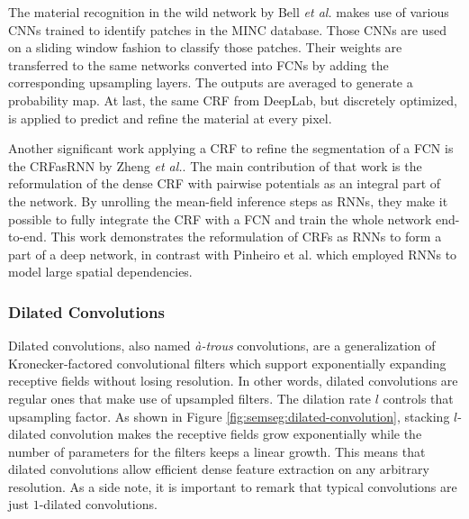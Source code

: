 The material recognition in the wild network by Bell \emph{et al.}\cite{Bell2015} makes use of various \acp{CNN} trained to identify patches in the \ac{MINC} database. Those \acp{CNN} are used on a sliding window fashion to classify those patches. Their weights are transferred to the same networks converted into \acp{FCN} by adding the corresponding upsampling layers. The outputs are averaged to generate a probability map. At last, the same \ac{CRF} from DeepLab, but discretely optimized, is applied to predict and refine the material at every pixel.

Another significant work applying a \ac{CRF} to refine the segmentation of a \ac{FCN} is the CRFasRNN by Zheng \emph{et al.}\cite{Zheng2015}. The main contribution of that work is the reformulation of the dense \ac{CRF} with pairwise potentials as an integral part of the network. By unrolling the mean-field inference steps as \acp{RNN}, they make it possible to fully integrate the \ac{CRF} with a \ac{FCN} and train the whole network end-to-end. This work demonstrates the reformulation of \acp{CRF} as \acp{RNN} to form a part of a deep network, in contrast with Pinheiro et al. \cite{Pinheiro2014} which employed \acp{RNN} to model large spatial dependencies.

\subsubsection{Dilated Convolutions}

Dilated convolutions, also named \emph{à-trous} convolutions, are a generalization of Kronecker-factored convolutional filters \cite{Zhou2015} which support exponentially expanding receptive fields without losing resolution. In other words, dilated convolutions are regular ones that make use of upsampled filters. The dilation rate $l$ controls that upsampling factor. As shown in Figure \ref{fig:semseg:dilated-convolution}, stacking $l$-dilated convolution makes the receptive fields grow exponentially while the number of parameters for the filters keeps a linear growth. This means that dilated convolutions allow efficient dense feature extraction on any arbitrary resolution. As a side note, it is important to remark that typical convolutions are just $1$-dilated convolutions.

